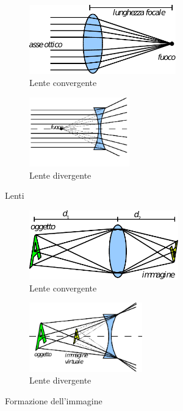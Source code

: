\begin{figure}
\begin{subfigure}[b]{.5\textwidth}
\centering
\includegraphics[height=3cm]{img/lente-convergente.pdf}
\caption{Lente convergente}\label{fig:lente-convergente}
\end{subfigure}
\begin{subfigure}[b]{.5\textwidth}
\centering
\includegraphics[height=3cm]{img/lente-divergente.pdf}
\caption{Lente divergente}\label{fig:lente-divergente}
\end{subfigure}
\caption{Lenti}
\label{fig:lenti}
\end{figure}

\begin{figure}
\begin{subfigure}[b]{.5\textwidth}
\centering
\includegraphics[height=3cm]{img/formazione-immagine.pdf}
\caption{Lente convergente}\label{fig:formazione-lente-convergente}
\end{subfigure}
\begin{subfigure}[b]{.5\textwidth}
\centering
\includegraphics[height=3cm]{img/formazione-immagine-divergente.pdf}
\caption{Lente divergente}\label{fig:formazione-lente-divergente}
\end{subfigure}
\caption{Formazione dell'immagine}
\label{fig:formazione-immagine}
\end{figure}

